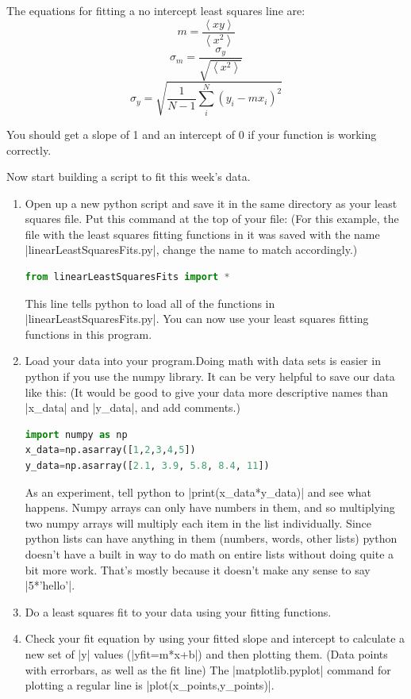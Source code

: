 \documentclass{book}
\begin{document}
\begin{enumerate}
The equations for fitting a no intercept least squares line are:
\[m=\frac{\left<xy\right>}{\left<x^2\right>}\]
\[\sigma_m=\frac{\sigma_y}{\sqrt{\left<x^2\right>}}\]
\[\sigma_y=\sqrt{\frac{1}{N-1}\sum_i^N \left(y_i-mx_i\right)^2}\]

You should get a slope of 1 and an intercept of 0 if your function is working correctly.
\end{enumerate}

Now start building a script to fit this week's data.
\begin{enumerate}
\item Open up a new python script and save it in the same directory as your least squares file.  Put this command at the top of your file: (For this example, the file with the least squares fitting functions in it was saved with the name |linearLeastSquaresFits.py|, change the name to match accordingly.)
\begin{lstlisting}[language=python]
from linearLeastSquaresFits import *
\end{lstlisting}
This line tells python to load all of the functions in |linearLeastSquaresFits.py|.  You can now use your least squares fitting functions in this program.

\item Load your data into your program.Doing math with data sets is easier in python if you use the numpy library.  It can be very helpful to save our data like this: (It would be good to give your data more descriptive names than |x_data| and |y_data|, and add comments.)
\begin{lstlisting}[language=python]
import numpy as np
x_data=np.asarray([1,2,3,4,5])
y_data=np.asarray([2.1, 3.9, 5.8, 8.4, 11])
\end{lstlisting}
As an experiment, tell python to |print(x_data*y\_data)| and see what happens.    Numpy arrays can only have numbers in them, and so multiplying two numpy arrays will multiply each item in the list individually.  Since python lists can have anything in them (numbers, words, other lists) python doesn't have a built in way to do math on entire lists without doing quite a bit more work.  That's mostly because it doesn't make any sense to say |5*'hello'|.

\item Do a least squares fit to your data using your fitting functions.

\item Check your fit equation by using your fitted slope and intercept to
calculate a new set of |y| values (|yfit=m*x+b|) and then plotting them. (Data points with errorbars, as well as the fit line) The |matplotlib.pyplot| command for plotting a regular line is |plot(x_points,y_points)|.


\end{enumerate}
\end{document}
